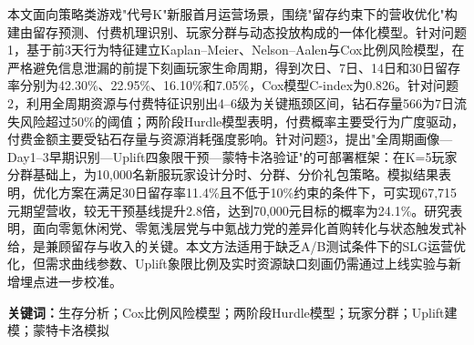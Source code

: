 本文面向策略类游戏"代号K"新服首月运营场景，围绕"留存约束下的营收优化"构建由留存预测、付费机理识别、玩家分群与动态投放构成的一体化模型。针对问题1，基于前3天行为特征建立Kaplan--Meier、Nelson--Aalen与Cox比例风险模型，在严格避免信息泄漏的前提下刻画玩家生命周期，得到次日、7日、14日和30日留存率分别为42.30\%、22.95\%、16.10\%和7.05\%，Cox模型C-index为0.826。针对问题2，利用全周期资源与付费特征识别出4--6级为关键瓶颈区间，钻石存量566为7日流失风险超过50\%的阈值；两阶段Hurdle模型表明，付费概率主要受行为广度驱动，付费金额主要受钻石存量与资源消耗强度影响。针对问题3，提出"全周期画像—Day1--3早期识别—Uplift四象限干预—蒙特卡洛验证"的可部署框架：在K=5玩家分群基础上，为10,000名新服玩家设计分时、分群、分价礼包策略。模拟结果表明，优化方案在满足30日留存率11.4\%且不低于10\%约束的条件下，可实现67,715元期望营收，较无干预基线提升2.8倍，达到70,000元目标的概率为24.1\%。研究表明，面向零氪休闲党、零氪浅层党与中氪战力党的差异化首购转化与状态触发式补给，是兼顾留存与收入的关键。本文方法适用于缺乏A/B测试条件下的SLG运营优化，但需求曲线参数、Uplift象限比例及实时资源缺口刻画仍需通过上线实验与新增埋点进一步校准。

\vspace{1em}
\noindent\textbf{关键词：}生存分析；Cox比例风险模型；两阶段Hurdle模型；玩家分群；Uplift建模；蒙特卡洛模拟
